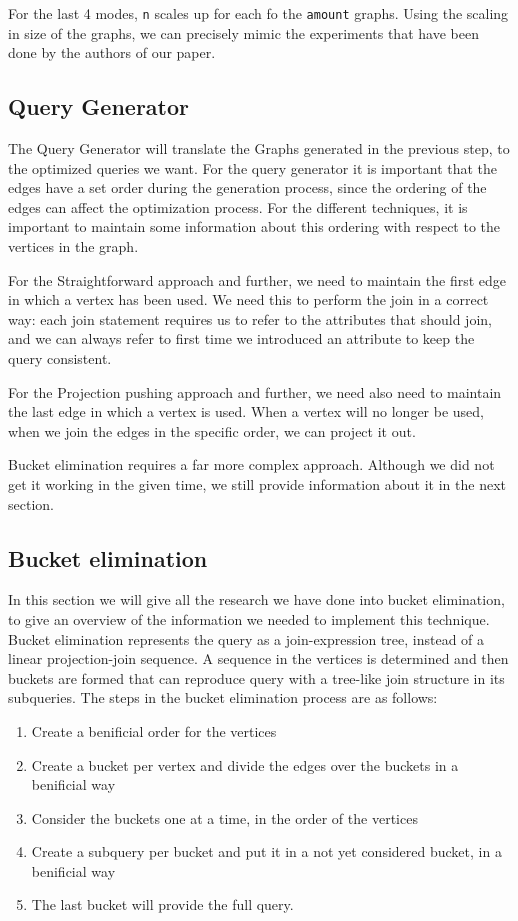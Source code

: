 For the last 4 modes, \texttt{n} scales up for each fo the \texttt{amount} graphs. Using the scaling in size of the graphs, we can precisely mimic the experiments that have been done by the authors of our paper.

\subsection{Query Generator}
The Query Generator will translate the Graphs generated in the previous step, to the optimized queries we want. For the query generator it is important that the edges have a set order during the generation process, since the ordering of the edges can affect the optimization process. For the different techniques, it is important to maintain some information about this ordering with respect to the vertices in the graph.

For the Straightforward approach and further, we need to maintain the first edge in which a vertex has been used. We need this to perform the join in a correct way: each join statement requires us to refer to the attributes that should join, and we can always refer to first time we introduced an attribute to keep the query consistent.

For the Projection pushing approach and further, we need also need to maintain the last edge in which a vertex is used. When a vertex will no longer be used, when we join the edges in the specific order, we can project it out.

Bucket elimination requires a far more complex approach. Although we did not get it working in the given time, we still provide information about it in the next section.

\subsection{Bucket elimination}
In this section we will give all the research we have done into bucket elimination, to give an overview of the information we needed to implement this technique.\\

Bucket elimination represents the query as a join-expression tree, instead of a linear projection-join sequence. A sequence in the vertices is determined and then buckets are formed that can reproduce query with a tree-like join structure in its subqueries. The steps in the bucket elimination process are as follows:

\begin{enumerate}
	\item Create a benificial order for the vertices
	\item Create a bucket per vertex and divide the edges over the buckets in a benificial way
	\item Consider the buckets one at a time, in the order of the vertices
	\item Create a subquery per bucket and put it in a not yet considered bucket, in a benificial way
	\item The last bucket will provide the full query.
\end{enumerate}

